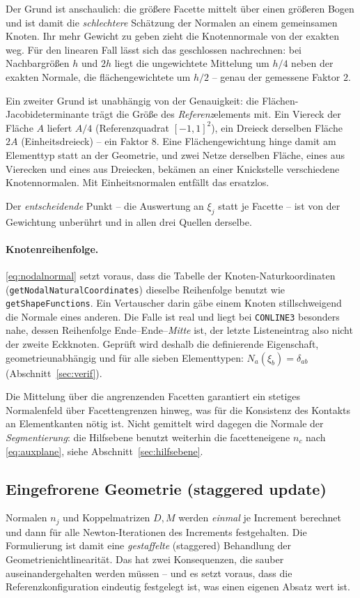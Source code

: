 \documentclass[a4paper,11pt]{article}
\def\bm#1{#1}%
\newcommand{\code}[1]{\texttt{\small #1}}
\begin{document}
\noindent Der Grund ist anschaulich: die größere Facette mittelt über einen größeren Bogen und ist
damit die \emph{schlechtere} Schätzung der Normalen an einem gemeinsamen Knoten. Ihr mehr Gewicht
zu geben zieht die Knotennormale von der exakten weg. Für den linearen Fall lässt sich das
geschlossen nachrechnen: bei Nachbargrößen $h$ und $2h$ liegt die ungewichtete Mittelung um $h/4$
neben der exakten Normale, die flächengewichtete um $h/2$ -- genau der gemessene Faktor $2$.

Ein zweiter Grund ist unabhängig von der Genauigkeit: die Flächen-Jacobideterminante trägt die
Größe des \emph{Referenz}elements mit. Ein Viereck der Fläche $A$ liefert $A/4$ (Referenzquadrat
$[-1,1]^2$), ein Dreieck derselben Fläche $2A$ (Einheitsdreieck) -- ein Faktor $8$. Eine
Flächengewichtung hinge damit am Elementtyp statt an der Geometrie, und zwei Netze derselben
Fläche, eines aus Vierecken und eines aus Dreiecken, bekämen an einer Knickstelle verschiedene
Knotennormalen. Mit Einheitsnormalen entfällt das ersatzlos.

Der \emph{entscheidende} Punkt -- die Auswertung an $\bm\xi_j$ statt je Facette -- ist von der
Gewichtung unberührt und in allen drei Quellen derselbe.

\paragraph{Knotenreihenfolge.}
\eqref{eq:nodalnormal} setzt voraus, dass die Tabelle der Knoten-Naturkoordinaten
(\code{getNodalNaturalCoordinates}) dieselbe Reihenfolge benutzt wie \code{getShapeFunctions}.
Ein Vertauscher darin gäbe einem Knoten stillschweigend die Normale eines anderen. Die Falle ist
real und liegt bei \code{CONLINE3} besonders nahe, dessen Reihenfolge Ende--Ende--\emph{Mitte}
ist, der letzte Listeneintrag also nicht der zweite Eckknoten. Geprüft wird deshalb die
definierende Eigenschaft, geometrieunabhängig und für alle sieben Elementtypen:
$N_a(\bm\xi_b)=\delta_{ab}$ (Abschnitt~\ref{sec:verif}).

\medskip
\noindent Die Mittelung über die angrenzenden Facetten garantiert ein stetiges Normalenfeld über
Facettengrenzen hinweg, was für die Konsistenz des Kontakts an Elementkanten nötig ist. Nicht
gemittelt wird dagegen die Normale der \emph{Segmentierung}: die Hilfsebene benutzt weiterhin die
facetteneigene $\bm n_c$ nach \eqref{eq:auxplane}, siehe Abschnitt~\ref{sec:hilfsebene}.

\subsection{Eingefrorene Geometrie (staggered update)}
\label{sec:frozen}
Normalen $\bm n_j$ und Koppelmatrizen $\bm D,\bm M$ werden \emph{einmal} je Increment berechnet und
dann für alle Newton-Iterationen des Increments festgehalten. Die Formulierung ist damit eine
\emph{gestaffelte} (staggered) Behandlung der Geometrienichtlinearität. Das hat zwei
Konsequenzen, die sauber auseinandergehalten werden müssen -- und es setzt voraus, dass die
Referenzkonfiguration eindeutig festgelegt ist, was einen eigenen Absatz wert ist.
\end{document}
